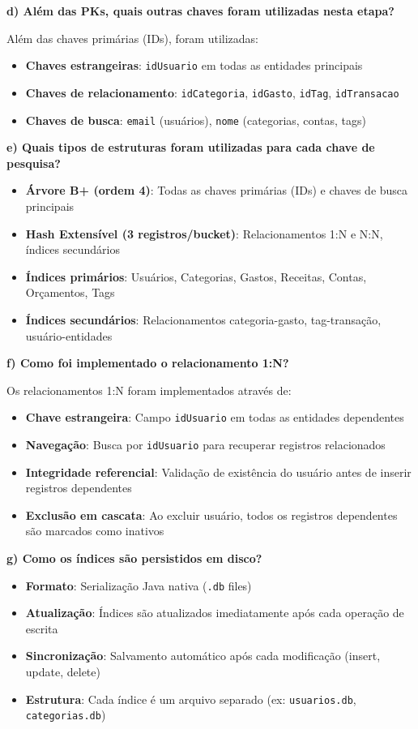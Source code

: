 \documentclass[12pt,a4paper]{article}
\begin{document}
\textbf{d) Além das PKs, quais outras chaves foram utilizadas nesta etapa?}

Além das chaves primárias (IDs), foram utilizadas:
\begin{itemize}
  \item \textbf{Chaves estrangeiras}: \texttt{idUsuario} em todas as entidades principais
  \item \textbf{Chaves de relacionamento}: \texttt{idCategoria}, \texttt{idGasto}, \texttt{idTag}, \texttt{idTransacao}
  \item \textbf{Chaves de busca}: \texttt{email} (usuários), \texttt{nome} (categorias, contas, tags)
\end{itemize}

\textbf{e) Quais tipos de estruturas foram utilizadas para cada chave de pesquisa?}

\begin{itemize}
  \item \textbf{Árvore B+ (ordem 4)}: Todas as chaves primárias (IDs) e chaves de busca principais
  \item \textbf{Hash Extensível (3 registros/bucket)}: Relacionamentos 1:N e N:N, índices secundários
  \item \textbf{Índices primários}: Usuários, Categorias, Gastos, Receitas, Contas, Orçamentos, Tags
  \item \textbf{Índices secundários}: Relacionamentos categoria-gasto, tag-transação, usuário-entidades
\end{itemize}

\textbf{f) Como foi implementado o relacionamento 1:N?}

Os relacionamentos 1:N foram implementados através de:
\begin{itemize}
  \item \textbf{Chave estrangeira}: Campo \texttt{idUsuario} em todas as entidades dependentes
  \item \textbf{Navegação}: Busca por \texttt{idUsuario} para recuperar registros relacionados
  \item \textbf{Integridade referencial}: Validação de existência do usuário antes de inserir registros dependentes
  \item \textbf{Exclusão em cascata}: Ao excluir usuário, todos os registros dependentes são marcados como inativos
\end{itemize}

\textbf{g) Como os índices são persistidos em disco?}

\begin{itemize}
  \item \textbf{Formato}: Serialização Java nativa (\texttt{.db} files)
  \item \textbf{Atualização}: Índices são atualizados imediatamente após cada operação de escrita
  \item \textbf{Sincronização}: Salvamento automático após cada modificação (insert, update, delete)
  \item \textbf{Estrutura}: Cada índice é um arquivo separado (ex: \texttt{usuarios.db}, \texttt{categorias.db})
\end{itemize}
\end{document}
